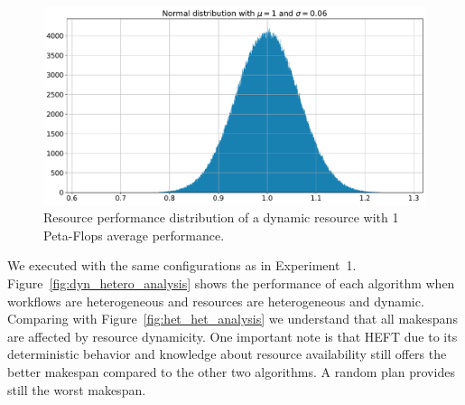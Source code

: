 \begin{figure}[ht!]
    \centering
    \includegraphics[width=.95\textwidth]{figures/campaign/DynRes.pdf}
    \caption{Resource performance distribution of a dynamic resource with 1 Peta-Flops average performance.}
    \label{fig:dynamic_res}
\end{figure}

We executed with the same configurations as in Experiment~1. 
Figure~\ref{fig:dyn_hetero_analysis} shows the performance of each algorithm when workflows are heterogeneous and resources are heterogeneous and dynamic.
Comparing with Figure~\ref{fig:het_het_analysis} we understand that all makespans are affected by resource dynamicity.
One important note is that HEFT due to its deterministic behavior and knowledge about resource availability still offers the better makespan compared to the other two algorithms.
A random plan provides still the worst makespan.

